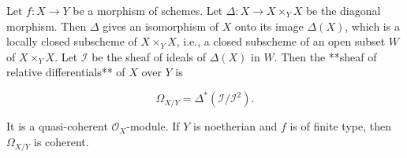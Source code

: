 Let $f: X \to Y$ be a morphism of schemes. Let $\Delta: X \to X \times_Y X$ be the diagonal morphism. Then $\Delta$ gives an isomorphism of $X$ onto its image $\Delta(X)$, which is a locally closed subscheme of $X \times_Y X$, i.e., a closed subscheme of an open subset $W$ of $X \times_Y X$. Let $\mathcal{I}$ be the sheaf of ideals of $\Delta(X)$ in $W$. Then the **sheaf of relative differentials** of $X$ over $Y$ is

$$\Omega_{X/Y} = \Delta^*(\mathcal{I}/\mathcal{I}^2).$$

It is a quasi-coherent $\mathcal{O}_X$-module. If $Y$ is noetherian and $f$ is of finite type, then $\Omega_{X/Y}$ is coherent.
